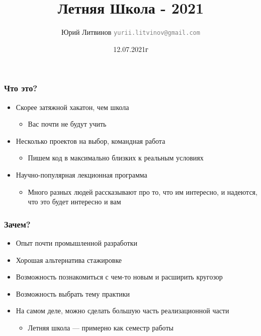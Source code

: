 \documentclass[xetex,mathserif,serif]{beamer}
\title{Летняя Школа - 2021}
\author[Юрий Литвинов]{Юрий Литвинов \newline \textcolor{gray}{\small\texttt{yurii.litvinov@gmail.com}}}
\date{12.07.2021г}
\begin{document}
    \frame{\titlepage}

    \begin{frame}
        \frametitle{Что это?}
        \begin{itemize}
            \item Скорее затяжной хакатон, чем школа
            \begin{itemize}
                \item Вас почти не будут учить
            \end{itemize}
            \item Несколько проектов на выбор, командная работа
            \begin{itemize}
                \item Пишем код в максимально близких к реальным условиях
            \end{itemize}
            \item Научно-популярная лекционная программа
            \begin{itemize}
                \item Много разных людей рассказывают про то, что им интересно, и надеются, что это будет интересно и вам
            \end{itemize}
        \end{itemize}
    \end{frame}

    \begin{frame}
        \frametitle{Зачем?}
        \begin{itemize}
            \item Опыт почти промышленной разработки
            \item Хорошая альтернатива стажировке
            \item Возможность познакомиться с чем-то новым и расширить кругозор
            \item Возможность выбрать тему практики
            \item На самом деле, можно сделать большую часть реализационной части
            \begin{itemize}
                \item Летняя школа --- примерно как семестр работы
            \end{itemize}
        \end{itemize}
    \end{frame}
\end{document}
